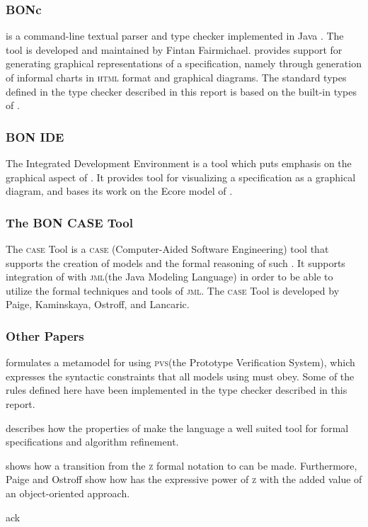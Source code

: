 \subsubsection{BONc}
 is a command-line textual \bon{} parser and type checker implemented in Java \cite{bonc}. The tool is developed and maintained by Fintan Fairmichael.  provides support for generating graphical representations of a \bon{} specification, namely through generation of informal charts in \textsc{html} format and graphical \bon{} diagrams. The standard types defined in the type checker described in this report is based on the built-in types of .

\subsubsection{BON IDE}
The \bon{} Integrated Development Environment is a tool which puts emphasis on the graphical aspect of \bon{} \cite{bonide}. It provides tool for visualizing a \bon{} specification as a graphical diagram, and bases its work on the Ecore model of \bon{}.

\subsubsection{The BON CASE Tool}
The \bon{} \textsc{case} Tool is a \textsc{case} (Computer-Aided Software Engineering) tool that supports the creation of \bon{} models and the formal reasoning of such \cite{boncase}. It supports integration of \bon{} with \textsc{jml}(the Java Modeling Language) in order to be able to utilize the formal techniques and tools of \textsc{jml}. The \bon{} \textsc{case} Tool is developed by Paige, Kaminskaya, Ostroff, and Lancaric.

\subsubsection{Other Papers}
\cite{ostroff2001} formulates a metamodel for \bon{} using \textsc{pvs}(the Prototype Verification System), which expresses the syntactic constraints that all models using \bon{} must obey. Some of the rules defined here have been implemented in the type checker described in this report.

\cite{ostroff1999} describes how the properties of \bon{} make the language a well suited tool for formal specifications and algorithm refinement.

\cite{ostroff1998} shows how a transition from the \textsc{z} formal notation to \bon{} can be made. Furthermore, Paige and Ostroff show how \bon{} has the expressive power of \textsc{z} with the added value of an object-oriented approach.

{ack}